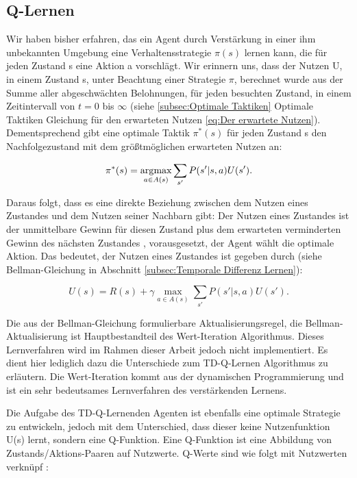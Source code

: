 \subsection{Q-Lernen}
Wir haben bisher erfahren, das ein Agent durch Verstärkung in einer ihm unbekannten Umgebung eine Verhaltensstrategie $\pi(s)$ lernen kann, die für jeden Zustand s eine Aktion a vorschlägt. Wir erinnern uns, dass der Nutzen U, in einem Zustand s, unter Beachtung einer Strategie $\pi$, berechnet wurde aus der Summe aller abgeschwächten Belohnungen, für jeden besuchten Zustand, in einem Zeitintervall von $t = 0$ bis $\infty$ (siehe \ref{subsec:Optimale Taktiken} Optimale Taktiken Gleichung für den erwarteten Nutzen \ref{eq:Der erwartete Nutzen}). Dementsprechend gibt eine optimale Taktik $\pi^*(s)$ für jeden Zustand s den Nachfolgezustand mit dem größtmöglichen erwarteten Nutzen an:

\begin{equation}
\pi^*(s) = \operatorname*{arg\!\max}_{a \in A(s)} \sum_{s'} P(s'|s, a) U(s').
\end{equation}

Daraus folgt, dass es eine direkte Beziehung zwischen dem Nutzen eines Zustandes und dem Nutzen seiner Nachbarn gibt: Der Nutzen eines Zustandes ist der unmittelbare Gewinn für diesen Zustand plus dem erwarteten verminderten Gewinn des nächsten Zustandes , vorausgesetzt, der Agent wählt die optimale Aktion. Das bedeutet, der Nutzen eines Zustandes ist gegeben durch (siehe Bellman-Gleichung in Abschnitt \ref{subsec:Temporale Differenz Lernen}):

\begin{equation}
U(s) = R(s) + \gamma \max_{a \in A(s)} \sum_{s'} P(s'|s, a) U(s').
\end{equation}

Die aus der Bellman-Gleichung formulierbare Aktualisierungsregel, die Bellman-Aktualisierung ist Hauptbestandteil des Wert-Iteration Algorithmus. Dieses Lernverfahren wird im Rahmen dieser Arbeit jedoch nicht implementiert. Es dient hier lediglich dazu die Unterschiede zum TD-Q-Lernen Algorithmus zu erläutern. Die Wert-Iteration kommt aus der dynamischen Programmierung und ist ein sehr bedeutsames Lernverfahren des verstärkenden Lernens.

Die Aufgabe des TD-Q-Lernenden Agenten ist ebenfalls eine optimale Strategie zu entwickeln, jedoch mit dem Unterschied, dass dieser keine Nutzenfunktion U(s) lernt, sondern eine Q-Funktion. Eine Q-Funktion ist eine Abbildung von Zustands/Aktions-Paaren auf Nutzwerte. Q-Werte sind wie folgt mit Nutzwerten verknüpf \cite[973]{Russell}:

